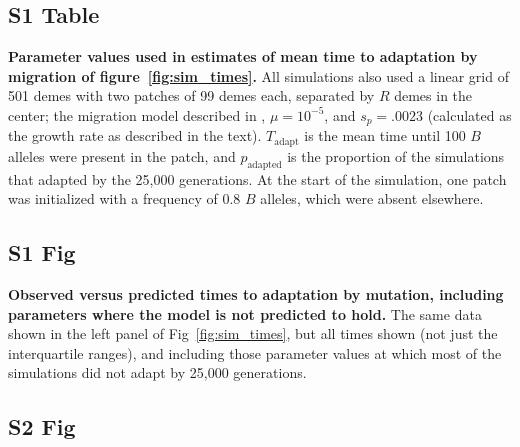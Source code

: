 \documentclass[10pt,letterpaper]{article}
\begin{document}
\subsection*{S1 Table}
\label{stab:migration_params}

%

\textbf{Parameter values used in estimates of mean time to adaptation by migration of figure~\ref{fig:sim_times}.}
All simulations also used a linear grid of 501 demes with two patches of 99 demes each,
separated by $R$ demes in the center;
the migration model described in ,
$\mu=10^{-5}$, and $s_p=.0023$ (calculated as the growth rate as described in the text).
$T_\text{adapt}$ is the mean time until 100 $B$ alleles were present in the patch,
and $p_\text{adapted}$ is the proportion of the simulations that adapted by the 25,000 generations.
At the start of the simulation, one patch was initialized with a frequency of 0.8 $B$ alleles, which were absent elsewhere.


\subsection*{S1 Fig}
\label{sfig:sim_migration_times}

      \textbf{Observed versus predicted times to adaptation by mutation, 
      including parameters where the model is not predicted to hold.}
    The same data shown in the left panel of Fig~\ref{fig:sim_times},
    but all times shown (not just the interquartile ranges),
    and including those parameter values at which most of the simulations did not adapt by 25,000 generations.


\subsection*{S2 Fig}
\label{sfig:sim_mutation_times}
\end{document}
